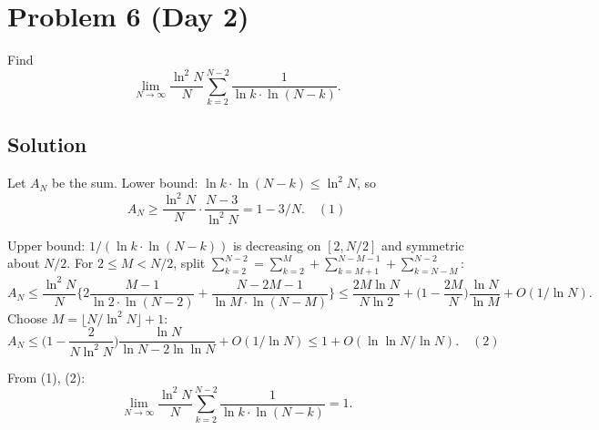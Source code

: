 \documentclass{article}
\begin{document}
\section*{Problem 6 (Day 2)}
Find
\[
\lim_{N\to\infty}\frac{\ln^2 N}{N}\sum_{k=2}^{N-2}\frac{1}{\ln k \cdot \ln(N-k)}.
\]

\subsection*{Solution}
Let $A_N$ be the sum. Lower bound: $\ln k \cdot \ln(N-k) \leq \ln^2 N$, so
\[
A_N \geq \frac{\ln^2 N}{N} \cdot \frac{N-3}{\ln^2 N} = 1 - 3/N. \quad (1)
\]

Upper bound: $1/(\ln k \cdot \ln(N-k))$ is decreasing on $[2, N/2]$ and symmetric about $N/2$. For $2 \leq M < N/2$, split $\sum_{k=2}^{N-2} = \sum_{k=2}^M + \sum_{k=M+1}^{N-M-1} + \sum_{k=N-M}^{N-2}$:
\[
A_N \leq \frac{\ln^2 N}{N}\Big\{2\frac{M-1}{\ln 2 \cdot \ln(N-2)} + \frac{N-2M-1}{\ln M \cdot \ln(N-M)}\Big\}
\leq \frac{2M\ln N}{N\ln 2} + \Big(1 - \frac{2M}{N}\Big)\frac{\ln N}{\ln M} + O(1/\ln N).
\]
Choose $M = \lfloor N/\ln^2 N\rfloor + 1$:
\[
A_N \leq \Big(1 - \frac{2}{N\ln^2 N}\Big)\frac{\ln N}{\ln N - 2\ln\ln N} + O(1/\ln N) \leq 1 + O(\ln\ln N / \ln N). \quad (2)
\]

From (1), (2):
\[
\lim_{N\to\infty}\frac{\ln^2 N}{N}\sum_{k=2}^{N-2}\frac{1}{\ln k \cdot \ln(N-k)} = 1.
\]
\end{document}
